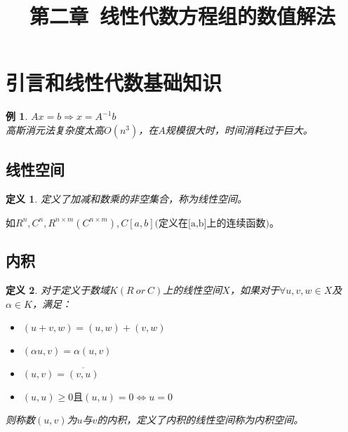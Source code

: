 \documentclass[a4paper]{article}
\title{第二章\ 线性代数方程组的数值解法}
\author{}
\date{}
\newtheorem{definition}{定义}[section]
\newtheorem{example}{例}[section]
\begin{document}
\maketitle

\section{引言和线性代数基础知识}

\begin{example}
$Ax=b \Rightarrow x=A^{-1}b$ \\
高斯消元法复杂度太高$O(n^3)$，在$A$规模很大时，时间消耗过于巨大。
\end{example}
\subsection{线性空间}
\begin{definition}
定义了加减和数乘的非空集合，称为线性空间。
\end{definition}
如$R^n, C^n, R^{n\times m}(C^{n\times m}), C[a,b] \text{(定义在[a,b]上的连续函数)}$。

\subsection{内积}
\begin{definition}
对于定义于数域$K(R \ or\  C)$上的线性空间$X$，如果对于$\forall$$u, v, w \in X$及$\alpha \in K$，满足：
\begin{itemize}
\item $(u+v, w)=(u, w) + (v, w)$
\item $(\alpha u, v)=\alpha (u, v)$
\item $(u, v)=\overline{(v, u)}$
\item $(u, u)\ge 0 且 (u, u)=0 \Leftrightarrow u=0$
\end{itemize}
则称数$(u,v)$为$u$与$v$的内积，定义了内积的线性空间称为内积空间。
\end{definition}
\end{document}

